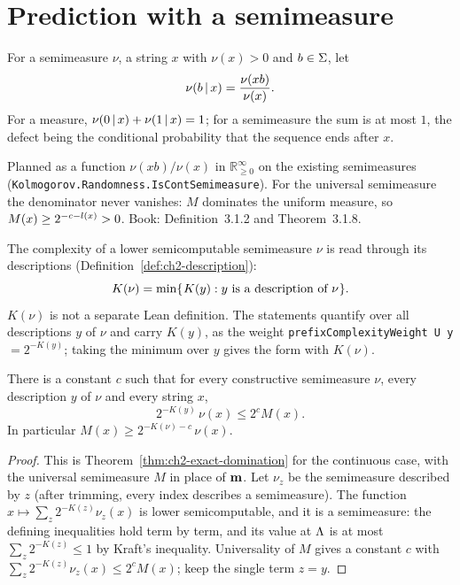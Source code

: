 \section{Prediction with a semimeasure}

\begin{definition}\label{def:sol-conditional}
For a semimeasure \( \nu \), a string \( x \) with \( \nu(x) > 0 \) and \( b \in \Sigma \), let
 \[
  \nu(b \,\vert\, x) = \frac{\nu(xb)}{\nu(x)}.
 \]
For a measure, \( \nu(0 \,\vert\, x) + \nu(1 \,\vert\, x) = 1 \); for a semimeasure the sum is
at most \( 1 \), the defect being the conditional probability that the sequence ends
after \( x \).
\end{definition}

\begin{formalization}
Planned as a function \( \nu(xb)/\nu(x) \) in \( \mathbb{R}_{\ge 0}^{\infty} \) on the existing
semimeasures (\texttt{Kolmogorov.Randomness.IsContSemimeasure}). For the universal
semimeasure the denominator never vanishes: \( M \) dominates the uniform measure, so
\( M(x) \ge 2^{-c-l(x)} > 0 \). Book: Definition~3.1.2 and Theorem~3.1.8.
\end{formalization}

The complexity of a lower semicomputable semimeasure \( \nu \) is read through its
descriptions (Definition~\ref{def:ch2-description}):
 \[
   K(\nu) = \min \mathopen\{\mskip 1mu K(y) : y \text{ is a description of } \nu\mskip 1mu\mathclose\}.
 \]
\( K(\nu) \) is not a separate Lean definition. The statements quantify over all
descriptions \( y \) of \( \nu \) and carry \( K(y) \), as the weight
\texttt{prefixComplexityWeight U y} \( = 2^{-K(y)} \); taking the minimum over \( y \)
gives the form with \( K(\nu) \).

\begin{theorem}
\label{thm:sol-dominance}
\leanok
{}
There is a constant \( c \) such that for every constructive semimeasure \( \nu \), every
description \( y \) of \( \nu \) and every string \( x \),
 \[
   2^{-K(y)}\,\nu(x) \le 2^{c} M(x).
 \]
In particular \( M(x) \ge 2^{-K(\nu)-c}\,\nu(x) \).
\end{theorem}
\begin{proof}
\leanok
{}
This is Theorem~\ref{thm:ch2-exact-domination} for the continuous case, with the universal
semimeasure \( M \) in place of \( \mathbf{m} \). Let \( \nu_{z} \) be the semimeasure described by \( z \) (after trimming, every index
describes a semimeasure). The function \( x \mapsto \sum_{z} 2^{-K(z)} \nu_{z}(x) \) is
lower semicomputable, and it is a semimeasure: the defining inequalities hold term by
term, and its value at \( \Lambda \) is at most \( \sum_{z} 2^{-K(z)} \le 1 \) by Kraft's
inequality. Universality of \( M \) gives a constant \( c \) with
\( \sum_{z} 2^{-K(z)}\nu_{z}(x) \le 2^{c} M(x) \); keep the single term \( z = y \).
\end{proof}

